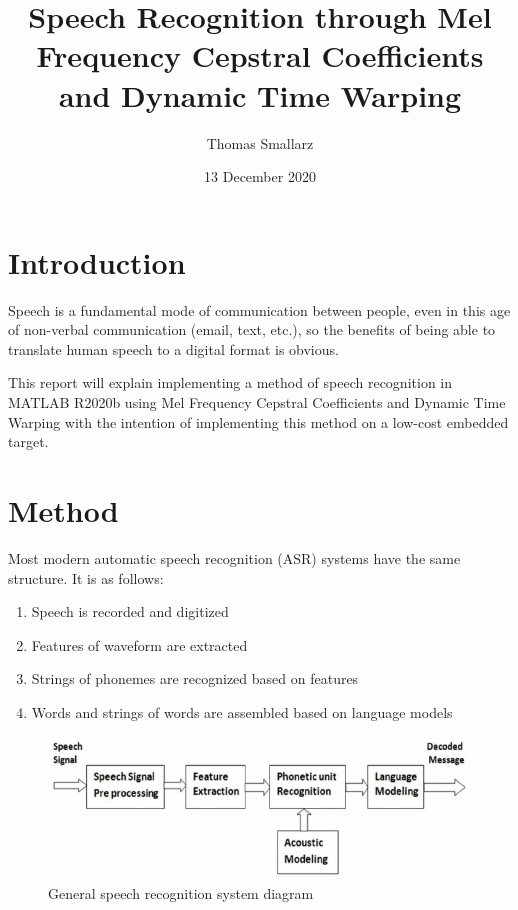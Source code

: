 \documentclass{article}
\title{Speech Recognition through Mel Frequency Cepstral Coefficients and Dynamic Time Warping}
\author{Thomas Smallarz}
\date{13 December 2020}
\begin{document}

\maketitle
\tableofcontents

\section*{Introduction}
Speech is a fundamental mode of communication between people, even in this age of non-verbal communication (email, text, etc.), so the benefits of being able to translate human speech to a digital format is obvious. 

This report will explain implementing a method of speech recognition in MATLAB R2020b using Mel Frequency Cepstral Coefficients and Dynamic Time Warping with the intention of implementing this method on a low-cost embedded target.

\section{Method}
Most modern automatic speech recognition (ASR) systems have the same structure. It is as follows:
\begin{enumerate}
    \item Speech is recorded and digitized
    \item Features of waveform are extracted
    \item Strings of phonemes are recognized based on features
    \item Words and strings of words are assembled based on language models
\end{enumerate}

\begin{figure}[H]
    \centering
    \includegraphics[width=\linewidth]{blockdiagram.png}
    \caption{General speech recognition system diagram}
    \label{fig:diagram}
\end{figure}
\end{document}
